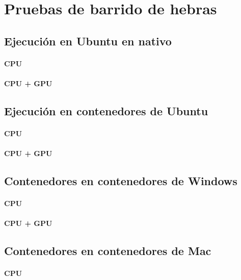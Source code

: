 \section{Pruebas de barrido de hebras}
\subsection{Ejecución en Ubuntu en nativo}
\paragraph{CPU}

\paragraph{CPU + GPU}

\subsection{Ejecución en contenedores de Ubuntu}
\paragraph{CPU}

\paragraph{CPU + GPU}

\subsection{Contenedores en contenedores de Windows}
\paragraph{CPU}

\paragraph{CPU + GPU}

\subsection{Contenedores en contenedores de Mac}
\paragraph{CPU}

